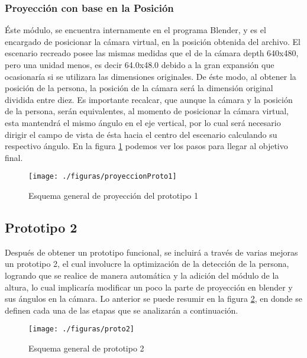 \documentclass[a4paper,openright,12pt]{report}
\begin{document}
\subsubsection{Proyección con base en la Posición}
Éste módulo, se encuentra internamente en el programa Blender, y es el encargado de posicionar la cámara virtual, en la posición obtenida del archivo. El escenario recreado posee las mismas medidas que el de la cámara depth 640x480, pero una unidad menos, es decir 64.0x48.0 debido a la gran expansión que ocasionaría si se utilizara las dimensiones originales. De éste modo, al obtener la posición de la persona, la posición de la cámara será la dimensión original dividida entre diez. Es importante recalcar, que aunque la cámara y la posición de la persona, serán equivalentes, al momento de posicionar la cámara virtual, esta mantendrá el mismo ángulo en el eje vertical, por lo cual será necesario dirigir el campo de vista de ésta hacia el centro del escenario calculando su respectivo ángulo. En la figura \ref{fig:proyeccionProto1}  podemos ver los pasos para llegar al objetivo final.
\begin{figure}[th]
	\centering
	\texttt{[image: ./figuras/proyeccionProto1]}
	\caption{Esquema general de proyección del prototipo 1} \label{fig:proyeccionProto1}
\end{figure}
\subsection{Prototipo 2}
Después de obtener un prototipo funcional, se incluirá a través de varias mejoras un prototipo 2, el cual involucre la optimización de la detección de la persona, logrando que se realice de manera automática y la adición del módulo de la altura, lo cual implicaría modificar un poco la parte de proyección en blender y sus ángulos en la cámara. Lo anterior se puede resumir en la figura \ref{fig:proto2}, en donde se definen cada una de las etapas que se analizarán a continuación.
\begin{figure}[th]
	\centering
	\texttt{[image: ./figuras/proto2]}
	\caption{Esquema general de prototipo 2} \label{fig:proto2}
\end{figure}
\end{document}
